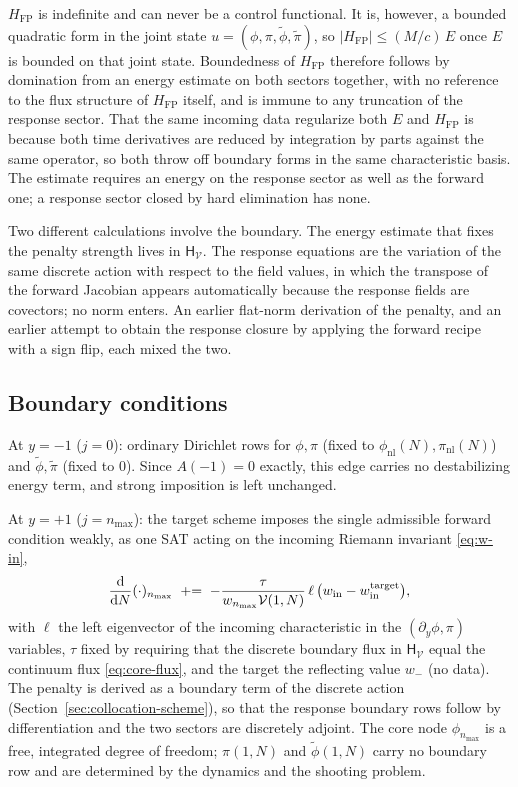 \documentclass[a4paper,11pt]{article}
\newcommand{\semibold}[1]{{\fontseries{b}\selectfont{#1}}}
\renewcommand{\leq}{\leqslant}
\renewcommand{\d}{\mathrm{d}}
\newenvironment{panel}{\begin{tcolorbox}[enhanced,breakable,colback=gray!10,colframe=gray!30]\small}{\end{tcolorbox}}
\newcommand{\Ny}{N}                          %
\newcommand{\field}{\phi}                    %
\newcommand{\mom}{\pi}                       %
\newcommand{\phinl}{\field_{\mathrm{nl}}}    %
\newcommand{\pinl}{\mom_{\mathrm{nl}}}       %
\newcommand{\rfield}{\widetilde\field}       %
\newcommand{\rmom}{\widetilde\mom}           %
\newcommand{\yco}{y}                         %
\newcommand{\advcoef}{A}                     %
\newcommand{\modeidx}{n}                     %
\newcommand{\volel}{\mathcal{V}}             %
\newcommand{\Hfp}{H_{\mathrm{FP}}}            %
\newcommand{\win}{w_{\mathrm{in}}}            %
\newcommand{\Hen}{E}                          %
\newcommand{\Hnorm}{\mathsf{H}}               %
\begin{document}
$\Hfp$ is indefinite and can never be a control functional. It is,
however, a bounded quadratic form in the joint state
$u=(\field,\mom,\rfield,\rmom)$, so $|\Hfp|\leq(M/c)\,\Hen$ once $\Hen$ is
bounded on that joint state. Boundedness of $\Hfp$ therefore follows by
domination from an energy estimate on both sectors together, with no
reference to the flux structure of $\Hfp$ itself, and is immune to any
truncation of the response sector. That the same incoming data regularize
both $\Hen$ and $\Hfp$ is because both time derivatives are reduced by
integration by parts against the same operator, so both throw off
boundary forms in the same characteristic basis. The estimate requires an
energy on the response sector as well as the forward one; a response
sector closed by hard elimination has none.

\begin{panel}
\semibold{Norm for stability, transpose for adjointness, never mixed.}
Two different calculations involve the boundary. The energy estimate that
fixes the penalty strength lives in $\Hnorm_\volel$. The response equations
are the variation of the same discrete action with respect to the field
values, in which the transpose of the forward Jacobian appears
automatically because the response fields are covectors; no norm enters.
An earlier flat-norm derivation of the penalty, and an earlier attempt to
obtain the response closure by applying the forward recipe with a sign
flip, each mixed the two.
\end{panel}

\subsection{Boundary conditions}
\label{sec:colloc-bcs}

At $\yco=-1$ ($j=0$): ordinary Dirichlet rows for $\field,\mom$ (fixed to
$\phinl(\Ny),\pinl(\Ny)$) and $\rfield,\rmom$ (fixed to $0$). Since
$\advcoef(-1)=0$ exactly, this edge carries no destabilizing energy term,
and strong imposition is left unchanged.

At $\yco=+1$ ($j=\modeidx_{\max}$): the target scheme imposes the single
admissible forward condition weakly, as one SAT acting on the incoming
Riemann invariant \eqref{eq:w-in},
\begin{equation}
    \frac{\d}{\d\Ny}(\cdot)_{\modeidx_{\max}}
    \;\mathrel{+}=\;
    -\frac{\tau}{w_{\modeidx_{\max}}\volel(1,\Ny)}\,\ell\,\big(\win-\win^{\rm target}\big) ,
    \label{eq:single-sat}
\end{equation}
with $\ell$ the left eigenvector of the incoming characteristic in the
$(\partial_\yco\field,\mom)$ variables, $\tau$ fixed by requiring that
the discrete boundary flux in $\Hnorm_\volel$ equal the continuum flux
\eqref{eq:core-flux}, and the target the reflecting value $w_-$ (no data).
The penalty is derived as a boundary term of the discrete action
(Section~\ref{sec:collocation-scheme}), so that the response boundary rows
follow by differentiation and the two sectors are discretely adjoint. The
core node $\field_{\modeidx_{\max}}$ is a free, integrated degree of
freedom; $\mom(1,\Ny)$ and $\rfield(1,\Ny)$ carry no boundary row and are
determined by the dynamics and the shooting problem.
\end{document}
